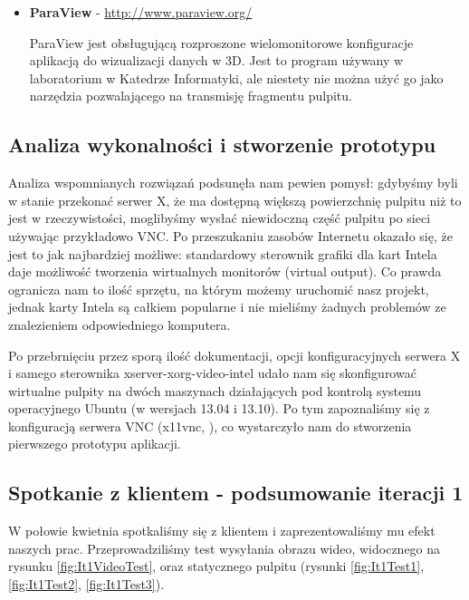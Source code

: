 \begin{itemize}
      \item \textbf{ParaView} - \url{http://www.paraview.org/}

        ParaView jest obsługującą rozproszone wielomonitorowe konfiguracje aplikacją do wizualizacji danych w 3D. Jest to program używany w laboratorium w Katedrze Informatyki, ale niestety nie można użyć go jako narzędzia pozwalającego na transmisję fragmentu pulpitu.
    \end{itemize}


  \subsection{Analiza wykonalności i stworzenie prototypu}
    Analiza wspomnianych rozwiązań podsunęła nam pewien pomysł: gdybyśmy byli w stanie przekonać serwer X, że ma dostępną większą powierzchnię pulpitu niż to jest w rzeczywistości, moglibyśmy wysłać niewidoczną część pulpitu po sieci używając przykładowo VNC. Po przeszukaniu zasobów Internetu okazało się, że jest to jak najbardziej możliwe: standardowy sterownik grafiki dla kart Intela daje możliwość tworzenia wirtualnych monitorów (virtual output). Co prawda ogranicza nam to ilość sprzętu, na którym możemy uruchomić nasz projekt, jednak karty Intela są całkiem popularne i nie mieliśmy żadnych problemów ze znalezieniem odpowiedniego komputera.


    Po przebrnięciu przez sporą ilość dokumentacji, opcji konfiguracyjnych serwera X i samego sterownika xserver-xorg-video-intel udało nam się skonfigurować wirtualne pulpity na dwóch maszynach działających pod kontrolą systemu operacyjnego Ubuntu (w wersjach 13.04 i 13.10). Po tym zapoznaliśmy się z konfiguracją serwera VNC (x11vnc, \cite{x11vncProj}), co wystarczyło nam do stworzenia pierwszego prototypu aplikacji.
    \vfill

  \subsection{Spotkanie z klientem - podsumowanie iteracji 1}
    W połowie kwietnia spotkaliśmy się z klientem i zaprezentowaliśmy mu efekt naszych prac. Przeprowadziliśmy test wysyłania obrazu wideo, widocznego na rysunku \ref{fig:It1VideoTest}, oraz statycznego pulpitu (rysunki \ref{fig:It1Test1}, \ref{fig:It1Test2}, \ref{fig:It1Test3}).


